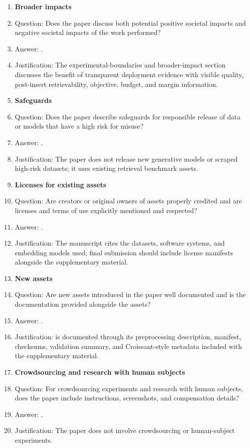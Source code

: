 \begin{enumerate}
\item {\bf Broader impacts}
    \item[] Question: Does the paper discuss both potential positive societal impacts and negative societal impacts of the work performed?
    \item[] Answer: \answerYes{}.
    \item[] Justification: The experimental-boundaries and broader-impact section discusses the benefit of transparent deployment evidence with visible quality, post-insert retrievability, objective, budget, and margin information.

\item {\bf Safeguards}
    \item[] Question: Does the paper describe safeguards for responsible release of data or models that have a high risk for misuse?
    \item[] Answer: \answerNA{}.
    \item[] Justification: The paper does not release new generative models or scraped high-risk datasets; it uses existing retrieval benchmark assets.

\item {\bf Licenses for existing assets}
    \item[] Question: Are creators or original owners of assets properly credited and are licenses and terms of use explicitly mentioned and respected?
    \item[] Answer: \answerYes{}.
    \item[] Justification: The manuscript cites the datasets, software systems, and embedding models used; final submission should include license manifests alongside the supplementary material.

\item {\bf New assets}
    \item[] Question: Are new assets introduced in the paper well documented and is the documentation provided alongside the assets?
    \item[] Answer: \answerYes{}.
    \item[] Justification: \hotpotmaxionbench{} is documented through its preprocessing description, manifest, checksums, validation summary, and Croissant-style metadata included with the supplementary material.

\item {\bf Crowdsourcing and research with human subjects}
    \item[] Question: For crowdsourcing experiments and research with human subjects, does the paper include instructions, screenshots, and compensation details?
    \item[] Answer: \answerNA{}.
    \item[] Justification: The paper does not involve crowdsourcing or human-subject experiments.


\end{enumerate}
